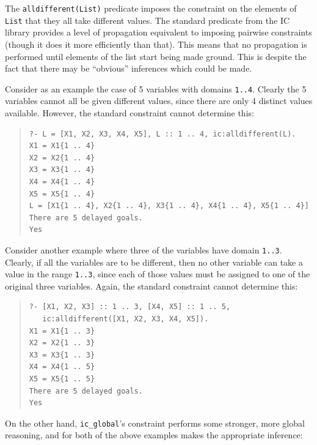 The \texttt{alldifferent(List)} predicate imposes the constraint on the
elements of \texttt{List} that they all take different values.
The standard 
predicate from the IC library provides a level of propagation equivalent to
imposing pairwise
%
constraints (though it does it more efficiently than that).  This means that
no propagation is performed until elements of the list start being made
ground.  This is despite the fact that there may be ``obvious'' inferences
which could be made.

Consider as an example the case of 5 variables with domains \texttt{1..4}.
Clearly the 5 variables cannot all be given different values, since there
are only 4 distinct values available.  However, the standard
 constraint
cannot determine this:

\begin{quote}\begin{verbatim}
?- L = [X1, X2, X3, X4, X5], L :: 1 .. 4, ic:alldifferent(L).
X1 = X1{1 .. 4}
X2 = X2{1 .. 4}
X3 = X3{1 .. 4}
X4 = X4{1 .. 4}
X5 = X5{1 .. 4}
L = [X1{1 .. 4}, X2{1 .. 4}, X3{1 .. 4}, X4{1 .. 4}, X5{1 .. 4}]
There are 5 delayed goals.
Yes
\end{verbatim}\end{quote}

Consider another example where three of the variables have domain
\texttt{1..3}.  Clearly, if all the variables are to be different, then no
other variable can take a value in the range \texttt{1..3}, since each of
those values must be assigned to one of the original three variables.
Again, the standard 
 constraint 
cannot determine this:

\begin{quote}\begin{verbatim}
?- [X1, X2, X3] :: 1 .. 3, [X4, X5] :: 1 .. 5,
   ic:alldifferent([X1, X2, X3, X4, X5]).
X1 = X1{1 .. 3}
X2 = X2{1 .. 3}
X3 = X3{1 .. 3}
X4 = X4{1 .. 5}
X5 = X5{1 .. 5}
There are 5 delayed goals.
Yes
\end{verbatim}\end{quote}

On the other hand, \texttt{ic_global}'s
constraint performs some stronger, more global reasoning, and for both of
the above examples makes the appropriate inference:

